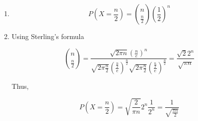 \begin{enumerate}[label=(\alph*)]
\item $$P(X = \frac{n}{2}) = \binom{n}{\frac{n}{2}}(\frac{1}{2})^{n}$$

\item Using Sterling's formula

$$\binom{n}{\frac{n}{2}} = \frac{\sqrt{2\pi n}(\frac{n}{e})^
{n}}{\sqrt{2\pi \frac{n}{2}}(\frac{\frac{n}{2}}{e})^
{\frac{n}{2}}\sqrt{2\pi \frac{n}{2}}(\frac{\frac{n}{2}}{e})^
{\frac{n}{2}}} = \frac{\sqrt{2}2^{n}}{\sqrt{\pi n}}$$

Thus,

$$P(X = \frac{n}{2}) = \sqrt{\frac{2}{\pi n}}2^{n} \frac{1}{2^{n}} = \frac{1}
{\sqrt{\frac{\pi n}{2}}}$$

\end{enumerate}